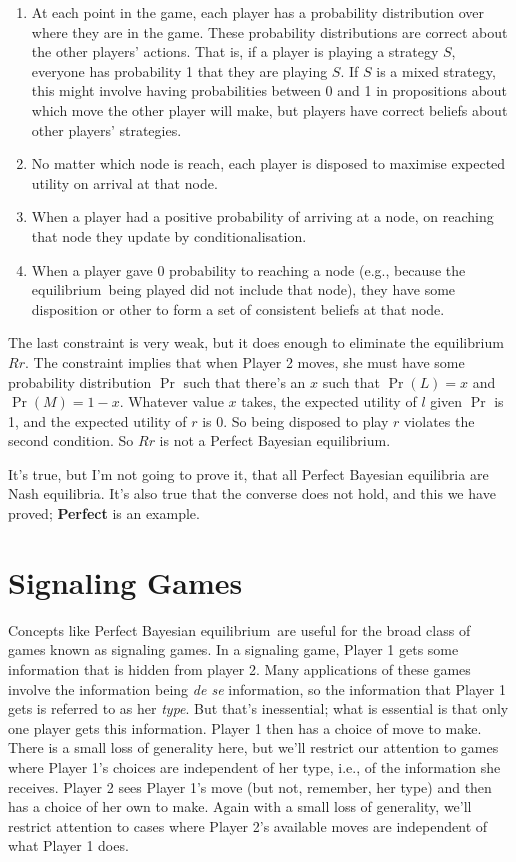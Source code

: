 \documentclass[
  11pt,
  letterpaper,
]{scrbook}
\providecommand{\tightlist}{%
  \setlength{\itemsep}{0pt}\setlength{\parskip}{0pt}}
\begin{document}
\begin{enumerate}
\def\labelenumi{\arabic{enumi}.}
\tightlist
\item
  At each point in the game, each player has a probability distribution
  over where they are in the game. These probability distributions are
  correct about the other players' actions. That is, if a player is
  playing a strategy \(S\), everyone has probability 1 that they are
  playing \(S\). If \(S\) is a mixed strategy, this might involve having
  probabilities between 0 and 1 in propositions about which move the
  other player will make, but players have correct beliefs about other
  players' strategies.
\item
  No matter which node is reach, each player is disposed to maximise
  expected utility on arrival at that node.
\item
  When a player had a positive probability of arriving at a node, on
  reaching that node they update by conditionalisation.
\item
  When a player gave 0 probability to reaching a node (e.g., because the
  equilibrium~being played did not include that node), they have some
  disposition or other to form a set of consistent beliefs at that node.
\end{enumerate}

The last constraint is very weak, but it does enough to eliminate the
equilibrium~\(Rr\). The constraint implies that when Player 2 moves, she
must have some probability distribution \(\Pr\) such that there's an
\(x\) such that \(\Pr(L) = x\) and \(\Pr(M) = 1-x\). Whatever value
\(x\) takes, the expected utility of \(l\) given \(\Pr\) is 1, and the
expected utility of \(r\) is 0. So being disposed to play \(r\) violates
the second condition. So \(Rr\) is not a Perfect Bayesian equilibrium.

It's true, but I'm not going to prove it, that all Perfect Bayesian
equilibria are Nash equilibria. It's also true that the converse does
not hold, and this we have proved; \textbf{Perfect} is an example.

\section{Signaling Games}\label{sec-signaling-games}

Concepts like Perfect Bayesian equilibrium~are useful for the broad
class of games known as signaling games. In a signaling game, Player 1
gets some information that is hidden from player 2. Many applications of
these games involve the information being \emph{de se} information, so
the information that Player 1 gets is referred to as her \emph{type}.
But that's inessential; what is essential is that only one player gets
this information. Player 1 then has a choice of move to make. There is a
small loss of generality here, but we'll restrict our attention to games
where Player 1's choices are independent of her type, i.e., of the
information she receives. Player 2 sees Player 1's move (but not,
remember, her type) and then has a choice of her own to make. Again with
a small loss of generality, we'll restrict attention to cases where
Player 2's available moves are independent of what Player 1 does.
\end{document}
